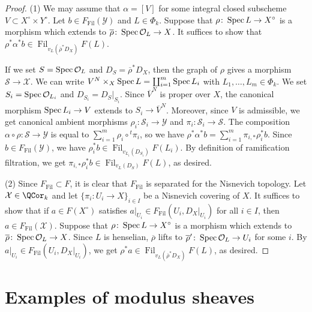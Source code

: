 \documentclass{amsart}
\theoremstyle{plain}
\theoremstyle{definition}
\theoremstyle{remark}
\numberwithin{equation}{section}
\DeclareMathOperator{\Fil}{Fil}
\begin{document}
\begin{proof}
	(1) We may assume that $\alpha = [V]$ for some integral closed subscheme $V\subset X^\circ\times Y^\circ$.
	Let $b\in F_{\Fil}(\mathcal{Y})$ and $L\in \Phi_k$.
	Suppose that $\rho\colon \operatorname{Spec} L\to X^\circ$ is a morphism which extends to $\overline{\rho}\colon \operatorname{Spec} \mathcal{O}_L\to X$.
	It suffices to show that $\rho^*\alpha^*b\in \Fil_{v_L(\overline{\rho}^*D_X)}F(L)$.
	
	If we set $S=\operatorname{Spec} \mathcal{O}_L$ and $D_S=\overline{\rho}^*D_X$, then the graph of $\rho$ gives a morphism $\mathcal{S}\to \mathcal{X}$.
	We can write $V^N\times_X\operatorname{Spec} L=\coprod_{i=1}^m \operatorname{Spec} L_i$ with $L_1,\dots,L_m\in \Phi_k$.
	We set $S_i=\operatorname{Spec} \mathcal{O}_{L_i}$ and $D_{S_i}=D_S|_{S_i}$.
	Since $\overline{V}^N$ is proper over $X$, the canonical morphism $\operatorname{Spec} L_i\to V$ extends to $S_i \to \overline{V}^N$.
	Moreover, since $V$ is admissible, we get canonical ambient morphisms $\rho_i\colon \mathcal{S}_i\to \mathcal{Y}$ and $\pi_i\colon \mathcal{S}_i\to \mathcal{S}$.
	The composition $\alpha\circ\rho\colon \mathcal{S}\to \mathcal{Y}$ is equal to $\sum_{i=1}^m \rho_i\circ {}^t\pi_i$, so we have $\rho^*\alpha^*b=\sum_{i=1}^m\pi_{i,*}\rho_i^*b$.
	Since $b\in F_{\Fil}(\mathcal{Y})$, we have $\rho_i^*b\in \Fil_{v_{L_i}(D_{S_i})}F(L_i)$.
	By definition of ramification filtration, we get $\pi_{i,*}\rho_i^*b\in \Fil_{v_L(D_S)}F(L)$, as desired.
	
	(2) Since $F_{\Fil}\subset F$, it is clear that $F_{\Fil}$ is separated for the Nisnevich topology.
	Let $\mathcal{X}\in \QCor_k$ and let $\{\pi_i\colon U_i\to X\}_{i\in I}$ be a Nisnevich covering of $X$.
	It suffices to show that if $a\in F(X^\circ)$ satisfies $a|_{U_i}\in F_{\Fil}(U_i,D_X|_{U_i})$ for all $i\in I$, then $a\in F_{\Fil}(\mathcal{X})$.
	Suppose that $\rho\colon \operatorname{Spec} L\to X^\circ$ is a morphism which extends to $\overline{\rho}\colon \operatorname{Spec} \mathcal{O}_L\to X$.
	Since $L$ is henselian, $\overline{\rho}$ lifts to $\overline{\rho}'\colon \operatorname{Spec} \mathcal{O}_L\to U_i$ for some $i$.
	By $a|_{U_i}\in F_{\Fil}(U_i,D_X|_{U_i})$, we get $\rho^*a\in \Fil_{v_L(\overline{\rho}^*D_X)}F(L)$, as desired.
\end{proof}









\section{Examples of modulus sheaves}
\end{document}
